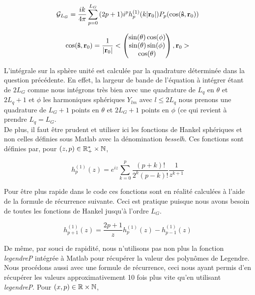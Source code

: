 \documentclass[10pt]{article}
\begin{document}
\begin{multicols}{2}
\begin{equation}
\mathcal{G}_{L_G} = \frac{ik}{4\pi}\sum_{p=0}^{L_G}{(2p+1)i^{p}h_p^{(1)}(k|{\bf r}_0|)P_p(\cos({\bf \hat{s}}, {\bf r}_0))}
\end{equation}

\vspace*{-11pt}

\begin{equation}
\cos({\bf \hat{s}}, {\bf r}_0) = \frac{1}{|{\bf r}_0|}< \begin{pmatrix} \sin(\theta)\cos(\phi)  \\ \sin(\theta)\sin(\phi)  \\ \cos(\theta) \end{pmatrix} , {\bf r}_0 >
\end{equation}


L'intégrale sur la sphère unité est calculée par la quadrature déterminée dans la question précédente. En effet, la largeur de bande de l'équation à intégrer étant de $2L_G$ comme nous intégrons très bien avec une quadrature de $L_q$ en $\theta$ et $2L_q+1$ et $\phi$ les harmoniques sphériques $Y_{lm}$ avec $l \le 2L_q$ nous prenons une quadrature de $L_G+1$ points en $\theta$ et $2L_G+1$ points en $\phi$ (ce qui revient à prendre $L_q=L_G$. \\
\indent
De plus, il faut être prudent et utiliser ici les fonctions de Hankel sphériques et non celles définies sous Matlab avec la dénomination \textit{besselh}. Ces fonctions sont définies par, pour $(z,p) \in \mathbb{R}^{*}_{+}\times\mathbb{N}$,

\begin{equation}
	h^{(1)}_{p}(z) = e^{iz}\sum_{k=0}^{p}{\frac{(p+k)!}{2^{k}(p-k)!}\frac{1}{z^{k+1}}}
\end{equation}

Pour être plus rapide dans le code ces fonctions sont en réalité calculées à l'aide de la formule de récurrence suivante. Ceci est pratique puisque nous avons besoin de toutes les fonctions de Hankel jusqu'à l'ordre $L_G$.

\begin{equation}
	h_{p+1}^{(1)}(z) =  \frac{2p+1}{z}h_{p}^{(1)}(z) - h_{p-1}^{(1)}(z) 
\end{equation}

De même, par souci de rapidité, nous n'utilisons pas non plus la fonction \textit{legendreP} intégrée à Matlab pour récupérer la valeur des polynômes de Legendre. Nous procédons aussi avec une formule de récurrence, ceci nous ayant permis d'en récupérer les valeurs approximativement 10 fois plus vite qu'en utilisant \textit{legendreP}. Pour $(x,p) \in \mathbb{R}\times\mathbb{N}$, 


\end{multicols}
\end{document}
